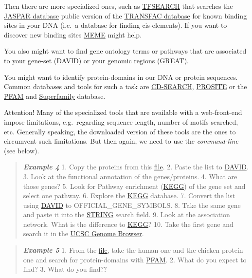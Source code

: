 \documentclass[]{article}
\begin{document}
Then there are more specialized ones, such as
\href{http://www.cbrc.jp/research/db/TFSEARCH.html}{TFSEARCH} that
searches the \href{http://jaspar.genereg.net/}{JASPAR database} public
version of the
\href{http://www.gene-regulation.com/pub/databases.html}{TRANSFAC
database} for known binding sites in your DNA (i.e.~a database for
finding cis-elements). If you want to discover new binding sites
\href{http://meme.nbcr.net/meme/}{MEME} might help.

You also might want to find gene ontology terms or pathways that are
associated to your gene-set
(\href{http://david.abcc.ncifcrf.gov/}{DAVID}) or your genomic regions
(\href{http://bejerano.stanford.edu/great/public/html/}{GREAT}).

You might want to identify protein-domains in our DNA or protein
sequences. Common databases and tools for such a task are
\href{http://www.ncbi.nlm.nih.gov/Structure/bwrpsb/bwrpsb.cgi?}{CD-SEARCH},
\href{http://prosite.expasy.org/}{PROSITE} or the
\href{http://pfam.xfam.org/}{PFAM} and
\href{http://supfam.org/SUPERFAMILY/hmm.html}{Superfamily} database.

Attention! Many of the specialized tools that are available with a
web-front-end impose limitations, e.g.~regarding sequence length, number
of motifs searched, etc. Generally speaking, the downloaded version of
these tools are the ones to circumvent such limitations. But then again,
we need to use the \emph{command-line} (see below).

\begin{quote}
\emph{\textbf{Example 4}} 1. Copy the proteins from this
\href{http://compbio.massey.ac.nz/wiki/data/c1/gene_set.txt}{file}. 2.
Paste the list to \href{http://david.abcc.ncifcrf.gov/}{DAVID}. 3. Look
at the functional annotation of the genes/proteins. 4. What are those
genes? 5. Look for Pathway enrichment
(\href{http://www.genome.jp/kegg/}{KEGG}) of the gene set and select one
pathway. 6. Explore the \href{http://www.genome.jp/kegg/}{KEGG}
database. 7. Convert the list using
\href{http://david.abcc.ncifcrf.gov/}{DAVID} to OFFICIAL\_GENE\_SYMBOLS.
8. Take the same gene and paste it into the
\href{http://string-db.org/}{STRING} search field. 9. Look at the
association network. What is the difference to
\href{http://www.genome.jp/kegg/}{KEGG}? 10. Take the first gene and
search it in the \href{http://genome.ucsc.edu/}{UCSC Genome Browser}.
\end{quote}

\begin{quote}
\emph{\textbf{Example 5}} 1. From the
\href{http://compbio.massey.ac.nz/wiki/data/c1/BRCA2_aa.fasta}{file},
take the human one and the chicken protein one and search for
protein-domains with \href{http://pfam.xfam.org/}{PFAM}. 2. What do you
expect to find? 3. What do you find??
\end{quote}
\end{document}
